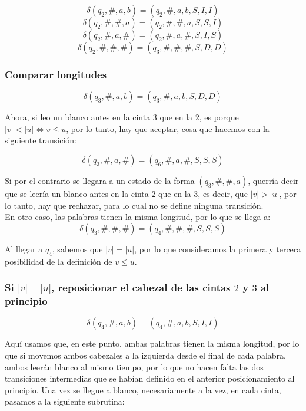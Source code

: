 \documentclass[12pt]{article}
\begin{document}
\begin{ejercicio}
        $$\delta(q_2, \#, a, b) = (q_2, \#, a, b, S, I, I)$$
        $$\delta(q_2, \#, \#, a) = (q_2, \#, \#, a, S, S, I)$$
        $$\delta(q_2, \#, a, \#) = (q_2, \#, a, \#, S, I, S)$$
        $$\delta(q_2, \#, \#, \#) = (q_3, \#, \#, \#, S, D, D)$$

        \subsubsection*{Comparar longitudes}

        $$\delta(q_3, \#, a, b) = (q_3, \#, a, b, S, D, D)$$

        Ahora, si leo un blanco antes en la cinta 3 que en la 2, es porque
        $|v| < |u| \iff v \leq u$, por lo tanto, hay que aceptar, cosa que
        hacemos con la siguiente transición:

        $$\delta(q_3, \#, a, \#) = (q_6, \#, a, \#, S, S, S)$$

        Si por el contrario se llegara a un estado de la forma $(q_3, \#, \#, a)$, 
        querría decir que se leería un blanco antes en la cinta 2 que en la 3, 
        es decir, que $|v| > |u|$, por lo tanto, hay que rechazar, para lo cual
        no se define ninguna transición. \\

        En otro caso, las palabras tienen la misma longitud, por lo que se llega a:
        $$\delta(q_3, \#, \#, \#) = (q_4, \#, \#, \#, S, S, S)$$

        Al llegar a $q_4$, sabemos que $|v| = |u|$, por lo que consideramos la
        primera y tercera posibilidad de la definición de $v \leq u$. 

        \subsubsection*{Si $|v| = |u|$, reposicionar el cabezal de las cintas $2$ y $3$ al principio}

        $$\delta(q_4, \#, a, b) = (q_4, \#, a, b, S, I, I)$$

        Aquí usamos que, en este punto, ambas palabras tienen la misma longitud,
        por lo que si movemos ambos cabezales a la izquierda desde el final de cada palabra,
        ambos leerán blanco al mismo tiempo, por lo que no hacen falta las dos
        transiciones intermedias que se habían definido en el anterior posicionamiento
        al principio. Una vez se llegue a blanco, necesariamente a la vez, en cada cinta, pasamos a la siguiente subrutina:


\end{ejercicio}
\end{document}
